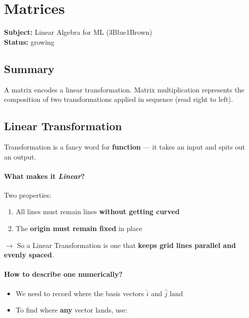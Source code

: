 \section{Matrices}
\label{sec:matrices}

\noindent\textbf{Subject:} Linear Algebra for ML (3Blue1Brown) \\
\textbf{Status:} growing

\subsection*{Summary}
A matrix encodes a linear transformation. Matrix multiplication represents the composition of two transformations applied in sequence (read right to left).

\subsection{Linear Transformation}

\begin{defbox}
Transformation is a fancy word for \textbf{function} --- it takes an input and spits out an output.
\end{defbox}

\paragraph{What makes it \emph{Linear}?} Two properties:
\begin{enumerate}[nosep]
  \item All lines must remain lines \textbf{without getting curved}
  \item The \textbf{origin must remain fixed} in place
\end{enumerate}

$\rightarrow$ So a Linear Transformation is one that \textbf{keeps grid lines parallel and evenly spaced}.

\paragraph{How to describe one numerically?}
\begin{itemize}[nosep]
  \item We need to record where the basis vectors $\hat{i}$ and $\hat{j}$ land
  \item To find where \textbf{any} vector lands, use:
\end{itemize}

